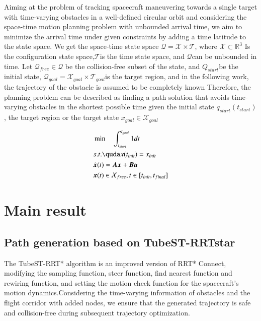 \documentclass[times,authoryear]{elsarticle}
\begin{document}
Aiming at the problem of tracking spacecraft maneuvering towards a single target with time-varying obstacles in a well-defined circular orbit and considering the space-time motion planning problem with unbounded arrival time, we aim to minimize the arrival time under given constraints by adding a time latitude to the state space. We get the space-time state space $\mathcal{Q} = \mathcal{X} \times \mathcal{T}$, where $\mathcal{X} \subset \mathbb{R}^3$ Is the configuration state space,$\mathcal{T}$is the time state space, and $\mathcal{Q}$can be unbounded in time. Let $\mathcal{Q}_{free}\in \mathcal{Q}$ be the collision-free subset of the state, and $Q_{start}$be the initial state, $\mathcal{Q}_{goal} = \mathcal{X}_{goal} \times \mathcal{T}_{goal}$is the target region, and in the following work, the trajectory of the obstacle is assumed to be completely known
Therefore, the planning problem can be described as finding a path solution that avoids time-varying obstacles in the shortest possible time given the initial state $q_{start}(t_{start})$, the target region or the target state $x_{goal} \in \mathcal{X}_{goal}$

\begin{equation}
  \begin{align}
    \label{problem}
    &\min \quad \int_{t_{start}}^{t_{goal}}1dt \\
    &s.t. \quda x(t_{init}) = x_{init} \\
    &\dot{\boldsymbol{x}}(t) = \boldsymbol{A}\boldsymbol{x}+\boldsymbol{B}\boldsymbol{u}\\
    & \boldsymbol{x}(t) \in \mathcal{X}_{free},t \in [t_{init},t_{final}]
  \end{align}
\end{equation}


\section{Main result}

\subsection{Path generation based on TubeST-RRTstar}

The TubeST-RRT* algorithm is an improved version of RRT* Connect, modifying the sampling function, steer function, find nearest function and rewiring function, and setting the motion check function for the spacecraft's motion dynamics.Considering the time-varying information of obstacles and the flight corridor with added nodes, we ensure that the generated trajectory is safe and collision-free during subsequent trajectory optimization. 
\end{document}
